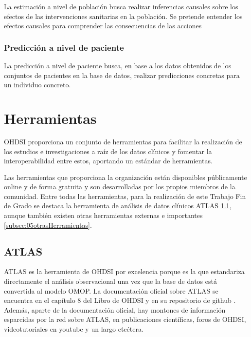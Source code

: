 La estimación a nivel de población busca realizar inferencias causales sobre los efectos de las intervenciones sanitarias en la población. Se pretende entender los efectos causales para comprender las consecuencias de las acciones

\subsubsection{Predicción a nivel de paciente}

La predicción a nivel de paciente busca, en base a los datos obtenidos de los conjuntos de pacientes en la base de datos, realizar predicciones concretas para un individuo concreto.

\section{Herramientas} \label{sec:05herramientas}

OHDSI proporciona un conjunto de herramientas para facilitar la realización de los estudios e investigaciones a raíz de los datos clínicos y fomentar la interoperabilidad entre estos, aportando un estándar de herramientas. 

Las herramientas que proporciona la organización están disponibles públicamente online y de forma gratuita y son desarrolladas por los propios miembros de la comunidad. Entre todas las herramientas, para la realización de este Trabajo Fin de Grado se destaca la herramienta de análisis de datos clínicos ATLAS \ref{subsec:05ATLAS}, aunque también existen otras herramientas externas e importantes \ref{subsec:05otrasHerramientas}.

\subsection{ATLAS} \label{subsec:05ATLAS}






ATLAS es la herramienta de OHDSI por excelencia porque es la que estandariza directamente el análisis observacional una vez que la base de datos está convertida al modelo OMOP. La documentación oficial sobre ATLAS se encuentra en el capítulo 8 del Libro de OHDSI y en su repositorio de github \cite{githubATLAS}. Además, aparte de la documentación oficial, hay montones de información esparcidas por la red sobre ATLAS, en publicaciones científicas, foros de OHDSI, videotutoriales en youtube y un largo etcétera.

